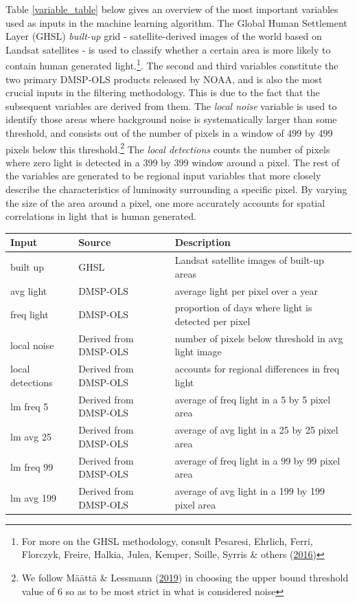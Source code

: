 \documentclass[11pt,preprint, authoryear]{elsarticle}
\let\origtable\table
\let\endorigtable\endtable
\renewenvironment{table}[1][2] {
    \expandafter\origtable\expandafter[H]
} {
    \endorigtable
}
\numberwithin{equation}{section}
\numberwithin{figure}{section}
\numberwithin{table}{section}
\let\rmarkdownfootnote\footnote%
\def\footnote{\protect\rmarkdownfootnote}
\begin{document}
Table \ref{variable_table} below gives an overview of the most important
variables used as inputs in the machine learning algorithm. The Global
Human Settlement Layer (GHSL) \emph{built-up} grid - satellite-derived
images of the world based on Landsat satellites - is used to classify
whether a certain area is more likely to contain human generated
light.\footnote{For more on the GHSL methodology, consult Pesaresi,
  Ehrlich, Ferri, Florczyk, Freire, Halkia, Julea, Kemper, Soille,
  Syrris \& others (\protect\hyperlink{ref-pesaresi2016operating}{2016})}.
The second and third variables constitute the two primary DMSP-OLS
products released by NOAA, and is also the most crucial inputs in the
filtering methodology. This is due to the fact that the subsequent
variables are derived from them. The \emph{local noise} variable is used
to identify those areas where background noise is systematically larger
than some threshold, and consists out of the number of pixels in a
window of 499 by 499 pixels below this threshold.\footnote{We follow
  Määttä \& Lessmann (\protect\hyperlink{ref-maatta}{2019}) in choosing
  the upper bound threshold value of 6 so as to be most strict in what
  is considered noise} The \emph{local detections} counts the number of
pixels where zero light is detected in a 399 by 399 window around a
pixel. The rest of the variables are generated to be regional input
variables that more closely describe the characteristics of luminosity
surrounding a specific pixel. By varying the size of the area around a
pixel, one more accurately accounts for spatial correlations in light
that is human generated.

\begin{table}
\begin{center}
\begin{tabular}{ |l|l|l| }
 \hline
 Input & Source & Description  \\ 
 \hline
  built up & GHSL & Landsat satellite images of built-up areas \\ 
  avg light & DMSP-OLS & average light per pixel over a year \\ 
  freq light & DMSP-OLS & proportion of days where light is detected per pixel \\
  local noise & Derived from DMSP-OLS & number of pixels below threshold in avg light image \\
  local detections & Derived from DMSP-OLS & accounts for regional differences in freq light \\
  lm freq 5 & Derived from DMSP-OLS & average of freq light in a 5 by 5 pixel area \\
  lm avg 25 & Derived from DMSP-OLS & average of avg light in a 25 by 25 pixel area \\
  lm freq 99 & Derived from DMSP-OLS & average of freq light in a 99 by 99 pixel area \\
  lm avg 199 & Derived from DMSP-OLS & average of avg light in a 199 by 199 pixel area \\
  \hline
\end{tabular}
\caption{Data Inputs}
\label{variable_table}
\end{center}
\end{table}
\end{document}
